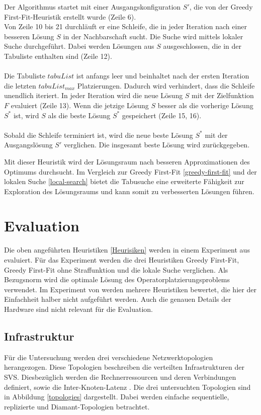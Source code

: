 \documentclass{article}
\begin{document}
Der Algorithmus startet mit einer Ausgangskonfiguration $S'$, die von der Greedy First-Fit-Heuristik erstellt wurde (Zeile 6). \\ 
Von Zeile 10 bis 21 durchläuft er eine Schleife, die in jeder Iteration nach einer besseren Lösung $S$ in der Nachbarschaft sucht. 
Die Suche wird mittels lokaler Suche durchgeführt. Dabei werden Lösungen aus $S$ ausgeschlossen, die in der Tabuliste enthalten sind (Zeile 12). \\ \\
Die Tabuliste $tabuList$ ist anfangs leer und beinhaltet nach der ersten Iteration die letzten $tabuList_{max}$ Platzierungen. 
Dadurch wird verhindert, dass die Schleife unendlich iteriert.
In jeder Iteration wird die neue Lösung $S$ mit der Zielfunktion $F$ evaluiert (Zeile 13). %
Wenn die jetzige Lösung $S$ besser als die vorherige Lösung $S^*$ ist, wird $S$ als die beste Lösung $S^*$ gespeichert (Zeile 15, 16). \\ \\
Sobald die Schleife terminiert ist, wird die neue beste Lösung $S^*$ mit der Ausgangslösung $S'$ verglichen. Die insgesamt beste Lösung wird zurückgegeben. 



Mit dieser Heuristik wird der Lösungsraum nach besseren Approximationen des Optimums durchsucht. 
Im Vergleich zur Greedy First-Fit \ref{greedy-first-fit} und der 
lokalen Suche \ref{local-search} bietet die Tabusuche eine erweiterte Fähigkeit zur Exploration 
des Lösungsraums und kann somit zu verbesserten Lösungen führen.


\section{Evaluation}
Die oben angeführten Heuristiken \ref{Heurisiken} werden in einem Experiment aus \cite{efficient-operator-placement} evaluiert. 
Für das Experiment werden die drei Heuristiken Greedy First-Fit, Greedy First-Fit ohne Straffunktion und die lokale Suche verglichen. 
Als Bezugsnorm wird die optimale Lösung des Operatorplatzierungsproblems verwendet. 
Im Experiment von \cite{efficient-operator-placement} werden mehrere Heuristiken bewertet, die hier der Einfachheit halber nicht aufgeführt werden. 
Auch die genauen Details der Hardware sind nicht relevant für die Evaluation.


\subsection{Infrastruktur}
Für die Untersuchung werden drei verschiedene Netzwerktopologien herangezogen. 
Diese Topologien beschreiben die verteilten Infrastrukturen der SVS. 
Diesbezüglich werden die Rechnerressourcen und deren Verbindungen definiert, sowie die Inter-Knoten-Latenz \cite{efficient-operator-placement}. 
Die drei untersuchten Topologien sind in Abbildung \ref{topologies} dargestellt. Dabei werden einfache sequentielle, replizierte und Diamant-Topologien betrachtet. \\
\end{document}
